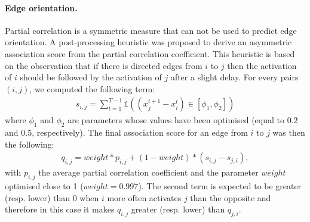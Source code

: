 \documentclass[wcp]{jmlr}
\begin{document}
\paragraph{Edge orientation.}
Partial correlation is a symmetric measure that can not be used to predict edge
orientation. A post-processing heuristic was proposed to derive an asymmetric
association score from the partial correlation coefficient. This heuristic is
based on the observation that if there is directed edges from $i$ to $j$ then
the activation of $i$ should be followed by the activation of $j$ after a
slight delay. For every pairs $(i,j)$, we computed the following term:
\begin{align}
s_{i,j} = \sum_{t=1}^{T - 1} \mathbb{1}((x_j^{t+1} - x_i^t) \in \left[\phi_1, \phi_2\right])
\end{align}
where $\phi_1$ and $\phi_2$ are parameters whose values have
been optimised (equal to $0.2$ and $0.5$, respectively). The
final association score for an edge from $i$ to $j$ was
then the following:
\begin{align}
q_{i,j} = weight * p_{i,j} + (1-weight) * (s_{i,j}-s_{j,i}),
\label{eqn:qij}
\end{align}
with $p_{i,j}$ the average partial correlation coefficient and the parameter
$weight$ optimised close to 1 ($weight=0.997$). The second term is expected to be
greater (resp. lower) than 0 when $i$ more often activates $j$ than the
opposite and therefore in this case it makes $q_{i,j}$ greater (resp. lower)
than $q_{j,i}$.
\newpage

\end{document}
